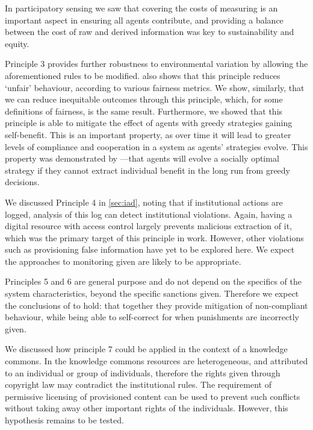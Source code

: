 In participatory sensing we saw that covering the costs of measuring is an
important aspect in ensuring all agents contribute, and providing a balance
between the cost of raw and derived information was key to sustainability and
equity.

Principle 3 provides further robustness to environmental variation by allowing
the aforementioned rules to be modified. \citet{Schaumeier2013} also shows
that this principle reduces `unfair' behaviour, according to various fairness
metrics. We show, similarly, that we can reduce inequitable outcomes through
this principle, which, for some definitions of fairness, is the same result.
Furthermore, we showed that this principle is able to mitigate the effect of
agents with greedy strategies gaining self-benefit. This is an important
property, as over time it will lead to greater levels of compliance and
cooperation in a system as agents' strategies evolve. This property was
demonstrated by \citet{Axelrod1984}---that agents will evolve a socially
optimal strategy if they cannot extract individual benefit in the long run
from greedy decisions.

We discussed Principle 4 in \autoref{sec:iad}, noting that if institutional
actions are logged, analysis of this log can detect institutional violations.
Again, having a digital resource with access control largely prevents
malicious extraction of it, which was the primary target of this principle in
 work. However, other violations such as
provisioning false information have yet to be explored here. We expect the
approaches to monitoring given are likely to be appropriate. %

Principles 5 and 6 are general purpose and do not depend on the specifics of
the system characteristics, beyond the specific sanctions given. Therefore we
expect the conclusions of \citet{Pitt2012b,Schaumeier2013} to hold: that
together they provide mitigation of non-compliant behaviour, while being able
to self-correct for when punishments are incorrectly given.

We discussed how principle 7 could be applied in the context of a knowledge
commons. In the knowledge commons resources are heterogeneous, and attributed
to an individual or group of individuals, therefore the rights given through
copyright law may contradict the institutional rules. The requirement of
permissive licensing of provisioned content can be used to prevent such
conflicts without taking away other important rights of the individuals.
However, this hypothesis remains to be tested.


